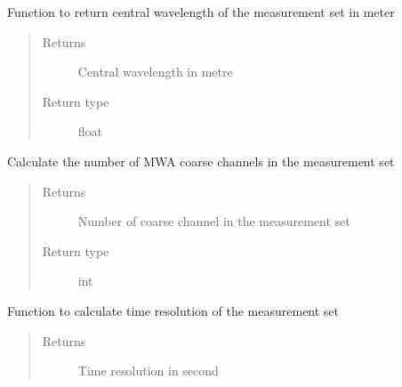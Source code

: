 \documentclass[letterpaper,10pt,english]{sphinxmanual}
\begin{document}
\begin{fulllineitems}

\begin{fulllineitems}
\label{\detokenize{paircars:paircars.access_ms.AccessMS.calc_meanwavelength}}
\sphinxAtStartPar
Function to return central wavelength of the measurement set in meter
\begin{quote}\begin{description}
\item[{Returns}] \leavevmode
\sphinxAtStartPar
Central wavelength in metre

\item[{Return type}] \leavevmode
\sphinxAtStartPar
float

\end{description}\end{quote}

\end{fulllineitems}


\begin{fulllineitems}
\label{\detokenize{paircars:paircars.access_ms.AccessMS.calc_ncoarse}}
\sphinxAtStartPar
Calculate the number of MWA coarse channels in the measurement set
\begin{quote}\begin{description}
\item[{Returns}] \leavevmode
\sphinxAtStartPar
Number of coarse channel in the measurement set

\item[{Return type}] \leavevmode
\sphinxAtStartPar
int

\end{description}\end{quote}

\end{fulllineitems}


\begin{fulllineitems}
\label{\detokenize{paircars:paircars.access_ms.AccessMS.calc_timeres}}
\sphinxAtStartPar
Function to calculate time resolution of the measurement set
\begin{quote}\begin{description}
\item[{Returns}] \leavevmode
\sphinxAtStartPar
Time resolution in second


\end{description}
\end{quote}
\end{fulllineitems}
\end{fulllineitems}
\end{document}
